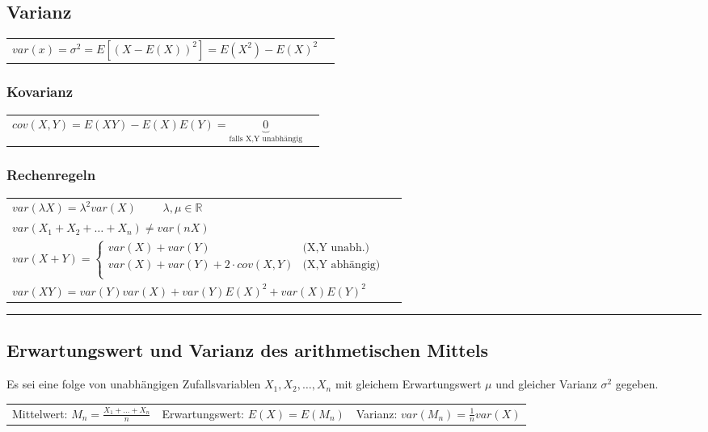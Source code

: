 	\begin{minipage}{9cm}
	\subsection{Varianz  }
		\begin{tabular}{ll}
		$var(x)=\sigma ^2=E[(X-E(X))^2]=E(X^2)-E(X)^2$\\
		\end{tabular}

		\subsubsection{Kovarianz }
		\begin{tabular}{ll}
        $cov(X,Y)=E(XY)-E(X)E(Y)=\underbrace{0}_{\text{falls X,Y unabhängig}}$
        \end{tabular}
	\end{minipage}
		\begin{minipage}{9cm}
		\subsubsection{Rechenregeln}
			\begin{tabular}{ll}
        	$var(\lambda X)=\lambda^2 var(X) \qquad $ $\lambda, \mu \in
        	\mathbb{R}$\\ 
        	$var(X_1+X_2+\ldots+X_n) \neq var(n X)$ \\
        	$var(X+Y)= \begin{cases}
	                      var(X)+var(Y)
	                      &	\text{(X,Y unabh.)}\\                     
	                      var(X) + var(Y) + 2 \cdot cov(X,Y) 
	                      &	\text{(X,Y abhängig)}\\
                     \end{cases} $ \\
        	$var(X Y)= var(Y)var(X)+var(Y)E(X)^2+var(X)E(Y)^2$
        	\end{tabular}
		\end{minipage}
\vspace{1mm}

\hrule

		\subsection{Erwartungswert und Varianz des arithmetischen Mittels }
		Es sei eine folge von unabhängigen Zufallsvariablen $X_1, X_2, \ldots , X_n$ mit gleichem
		Erwartungswert $ \mu $ und gleicher Varianz $ \sigma^2 $ gegeben.  \\
		\begin{tabular}{p{6cm} p{6cm} p{6cm}}
	        Mittelwert: $M_n=\frac{X_1+\ldots+X_n}{n}$ 
	        & Erwartungswert: $E(X)=E(M_n)$
	        & Varianz: $var(M_n)=\frac{1}{n}var(X)$
        \end{tabular}
\vspace{1mm}

